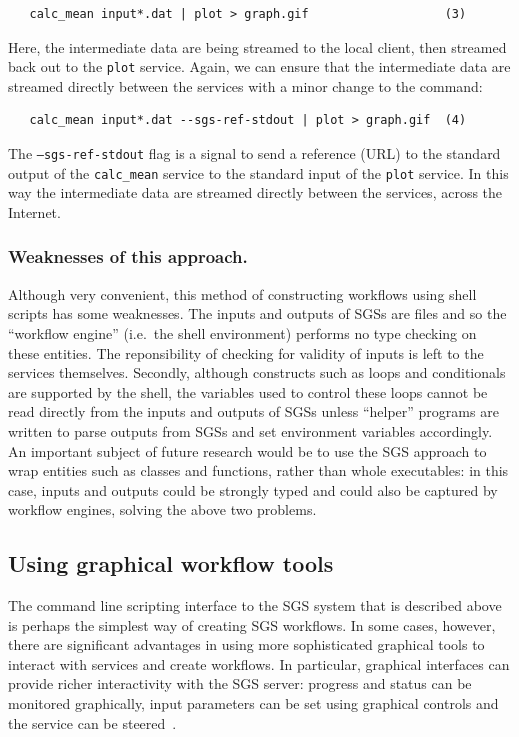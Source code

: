\documentclass{llncs}
\begin{document}
\begin{verbatim}
   calc_mean input*.dat | plot > graph.gif                   (3)
\end{verbatim}

Here, the intermediate data are being streamed to the local client, then streamed back out to the {\tt plot} service.  Again, we can ensure that the intermediate data are streamed directly between the services with a minor change to the command:

\begin{verbatim}
   calc_mean input*.dat --sgs-ref-stdout | plot > graph.gif  (4)
\end{verbatim}

The {\tt --sgs-ref-stdout} flag is a signal to send a reference (URL) to the standard output of the {\tt calc\_mean} service to the standard input of the {\tt plot} service.  In this way the intermediate data are streamed directly between the services, across the Internet.

\subsubsection{Weaknesses of this approach.}
Although very convenient, this method of constructing workflows using shell scripts has some weaknesses.  The inputs and outputs of SGSs are files and so the ``workflow engine'' (i.e.\ the shell environment) performs no type checking on these entities.  The reponsibility of checking for validity of inputs is left to the services themselves.  Secondly, although constructs such as loops and conditionals are supported by the shell, the variables used to control these loops cannot be read directly from the inputs and outputs of SGSs unless ``helper'' programs are written to parse outputs from SGSs and set environment variables accordingly.  An important subject of future research would be to use the SGS approach to wrap entities such as classes and functions, rather than whole executables: in this case, inputs and outputs could be strongly typed and could also be captured by workflow engines, solving the above two problems.

\subsection{Using graphical workflow tools}\label{subsec:graphical-workflow}
The command line scripting interface to the SGS system that is described above is perhaps the simplest way of creating SGS workflows.  In some cases, however, there are significant advantages in using more sophisticated graphical tools to interact with services and create workflows.  In particular, graphical interfaces can provide richer interactivity with the SGS server: progress and status can be monitored graphically, input parameters can be set using graphical controls and the service can be steered~\cite{blower:2005}.
\end{document}
